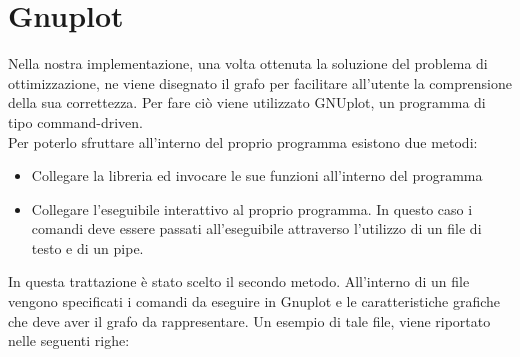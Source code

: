 \chapter{Gnuplot}\label{gnuplot}
Nella nostra implementazione, una volta ottenuta la soluzione del problema di ottimizzazione, ne viene disegnato il grafo per facilitare all'utente la comprensione della sua correttezza. Per fare ciò viene utilizzato GNUplot, un programma di tipo command-driven.\\
Per poterlo sfruttare all'interno del proprio programma esistono due metodi:
\begin{itemize}
\item{Collegare la libreria ed invocare le sue funzioni all'interno del programma}
\item{Collegare l'eseguibile interattivo al proprio programma. In questo caso i comandi deve essere passati all'eseguibile attraverso l'utilizzo di un file di testo e di un pipe.}\\
\end{itemize}
In questa trattazione è stato scelto il secondo metodo. All'interno di un file vengono specificati i comandi da eseguire in Gnuplot e le caratteristiche grafiche che deve aver il grafo da rappresentare. Un esempio di tale file, viene riportato nelle seguenti righe:\\



